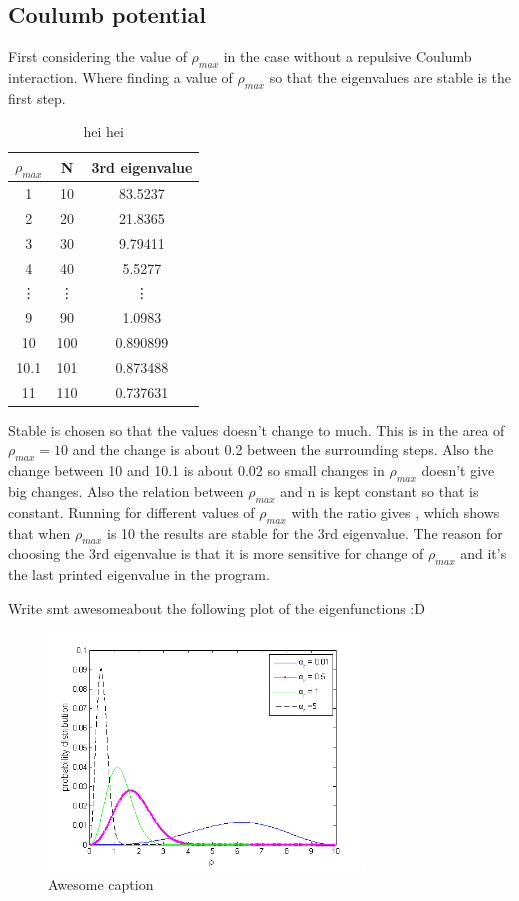 
\subsection*{Coulumb potential}


First considering the value of $\rho_{max}$ in the case without a repulsive Coulumb interaction. Where finding a value of $\rho_{max}$ so that the eigenvalues are stable is the first step.   
\begin{table}
\caption{hei hei} 
\label{tab:rhomax}
\phantom{.}
\begin{tabular}{|c|c|c|}
\hline
$\rho_{max}$ & N & 3rd eigenvalue \\
\hline 
1 & 10 & 83.5237 \\
2 & 20 & 21.8365 \\
3 & 30 & 9.79411 \\
4 & 40 & 5.5277 \\
\vdots & \vdots & \vdots \\
9 & 90 & 1.0983 \\
10 & 100 & 0.890899 \\
10.1 & 101 & 0.873488 \\
11 & 110 & 0.737631 \\
\hline

\end{tabular}

\end{table}
Stable is chosen so that the values doesn't change to much. This is in the area of $\rho_{max} = 10$ and the change is about 0.2 between the surrounding steps. Also the change between 10 and 10.1 is about 0.02 so small changes in $\rho_{max} $ doesn't give big changes. Also the relation between $\rho_{max}$ and n is kept constant so that  is constant. Running for different values of $\rho_{max}$ with the ratio gives , which shows that when $\rho_{max} $ is 10 the results are stable for the 3rd eigenvalue. The reason for choosing the 3rd eigenvalue is that it is more sensitive for change of $\rho_{max}$ and it's the last printed eigenvalue in the program. 


Write smt awesomeabout the following plot of the eigenfunctions :D

\begin{figure}[H]
	\centering
	\includegraphics[width=0.75\textwidth]{Figures/ProbFuncOmega.png}
	\caption{Awesome caption}
	\label{fig:ProbFuncOmega}
\end{figure}





